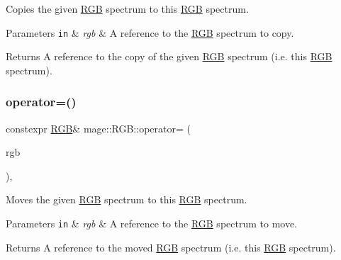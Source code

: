 Copies the given \mbox{\hyperlink{structmage_1_1_r_g_b}{R\+GB}} spectrum to this \mbox{\hyperlink{structmage_1_1_r_g_b}{R\+GB}} spectrum.


\begin{DoxyParams}[1]{Parameters}
\mbox{\tt in}  & {\em rgb} & A reference to the \mbox{\hyperlink{structmage_1_1_r_g_b}{R\+GB}} spectrum to copy. \\
\hline
\end{DoxyParams}
\begin{DoxyReturn}{Returns}
A reference to the copy of the given \mbox{\hyperlink{structmage_1_1_r_g_b}{R\+GB}} spectrum (i.\+e. this \mbox{\hyperlink{structmage_1_1_r_g_b}{R\+GB}} spectrum). 
\end{DoxyReturn}
\mbox{\label{structmage_1_1_r_g_b_a87257a9536e7b2eabd49553df67e8945}} 
\subsubsection{\texorpdfstring{operator=()}{operator=()}\hspace{0.1cm}{\footnotesize\ttfamily [2/2]}}
{\footnotesize\ttfamily constexpr \mbox{\hyperlink{structmage_1_1_r_g_b}{R\+GB}}\& mage\+::\+R\+G\+B\+::operator= (\begin{DoxyParamCaption}\item[{\mbox{\hyperlink{structmage_1_1_r_g_b}{R\+GB}} \&\&}]{rgb }\end{DoxyParamCaption})\hspace{0.3cm}{\ttfamily [default]}, {\ttfamily [noexcept]}}

Moves the given \mbox{\hyperlink{structmage_1_1_r_g_b}{R\+GB}} spectrum to this \mbox{\hyperlink{structmage_1_1_r_g_b}{R\+GB}} spectrum.


\begin{DoxyParams}[1]{Parameters}
\mbox{\tt in}  & {\em rgb} & A reference to the \mbox{\hyperlink{structmage_1_1_r_g_b}{R\+GB}} spectrum to move. \\
\hline
\end{DoxyParams}
\begin{DoxyReturn}{Returns}
A reference to the moved \mbox{\hyperlink{structmage_1_1_r_g_b}{R\+GB}} spectrum (i.\+e. this \mbox{\hyperlink{structmage_1_1_r_g_b}{R\+GB}} spectrum). 
\end{DoxyReturn}
\mbox{\label{structmage_1_1_r_g_b_a363d6235bc2c68907addb5326df07dc7}} 
